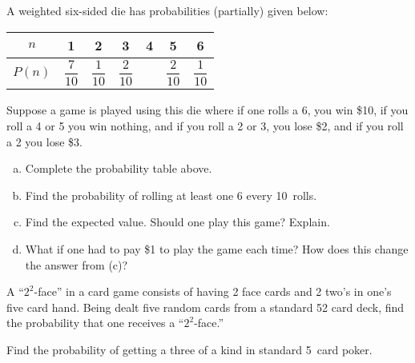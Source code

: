 \documentclass[11pt,letterpaper]{article}
\begin{document}
 A weighted six-sided die has probabilities (partially) given below: \par
	\begin{table}[!ht]
	\centering
	\begin{tabular}{|c||c|c|c|c|c|c|} \hline
	$n$ & 1 & 2 & 3 & 4 & 5 & 6 \\ \hline
	$P(n)$ & $\dfrac{7}{10}$ & $\dfrac{1}{10}$ & $\dfrac{2}{10}$ & & $\dfrac{2}{10}$ & $\dfrac{1}{10}$ \\ \hline
	\end{tabular}
	\end{table} \par
Suppose a game is played using this die where if one rolls a 6, you win \$10, if you roll a 4 or 5 you win nothing, and if you roll a 2 or 3, you lose \$2, and if you roll a 2 you lose \$3. 

\begin{enumerate}[(a)]
\item Complete the probability table above.
\item Find the probability of rolling at least one 6 every 10~rolls. 
\item Find the expected value. Should one play this game? Explain.
\item What if one had to pay \$1 to play the game each time? How does this change the answer from (c)? 
\end{enumerate}






\newpage





 A ``$2^2$-face'' in a card game consists of having 2 face cards and 2 two's in one's five card hand. Being dealt five random cards from a standard 52 card deck, find the probability that one receives a ``$2^2$-face.'' 





\newpage





 Find the probability of getting a three of a kind in standard 5~card poker. \pspace
\end{document}
